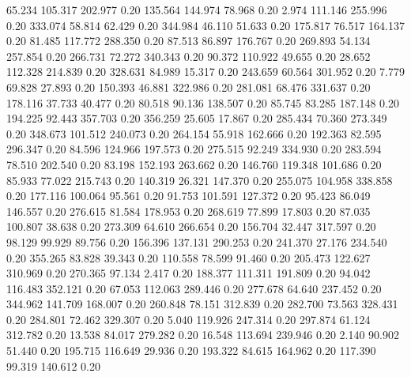   65.234  105.317  202.977         0.20
 135.564  144.974   78.968         0.20
   2.974  111.146  255.996         0.20
 333.074   58.814   62.429         0.20
 344.984   46.110   51.633         0.20
 175.817   76.517  164.137         0.20
  81.485  117.772  288.350         0.20
  87.513   86.897  176.767         0.20
 269.893   54.134  257.854         0.20
 266.731   72.272  340.343         0.20
  90.372  110.922   49.655         0.20
  28.652  112.328  214.839         0.20
 328.631   84.989   15.317         0.20
 243.659   60.564  301.952         0.20
   7.779   69.828   27.893         0.20
 150.393   46.881  322.986         0.20
 281.081   68.476  331.637         0.20
 178.116   37.733   40.477         0.20
  80.518   90.136  138.507         0.20
  85.745   83.285  187.148         0.20
 194.225   92.443  357.703         0.20
 356.259   25.605   17.867         0.20
 285.434   70.360  273.349         0.20
 348.673  101.512  240.073         0.20
 264.154   55.918  162.666         0.20
 192.363   82.595  296.347         0.20
  84.596  124.966  197.573         0.20
 275.515   92.249  334.930         0.20
 283.594   78.510  202.540         0.20
  83.198  152.193  263.662         0.20
 146.760  119.348  101.686         0.20
  85.933   77.022  215.743         0.20
 140.319   26.321  147.370         0.20
 255.075  104.958  338.858         0.20
 177.116  100.064   95.561         0.20
  91.753  101.591  127.372         0.20
  95.423   86.049  146.557         0.20
 276.615   81.584  178.953         0.20
 268.619   77.899   17.803         0.20
  87.035  100.807   38.638         0.20
 273.309   64.610  266.654         0.20
 156.704   32.447  317.597         0.20
  98.129   99.929   89.756         0.20
 156.396  137.131  290.253         0.20
 241.370   27.176  234.540         0.20
 355.265   83.828   39.343         0.20
 110.558   78.599   91.460         0.20
 205.473  122.627  310.969         0.20
 270.365   97.134    2.417         0.20
 188.377  111.311  191.809         0.20
  94.042  116.483  352.121         0.20
  67.053  112.063  289.446         0.20
 277.678   64.640  237.452         0.20
 344.962  141.709  168.007         0.20
 260.848   78.151  312.839         0.20
 282.700   73.563  328.431         0.20
 284.801   72.462  329.307         0.20
   5.040  119.926  247.314         0.20
 297.874   61.124  312.782         0.20
  13.538   84.017  279.282         0.20
  16.548  113.694  239.946         0.20
   2.140   90.902   51.440         0.20
 195.715  116.649   29.936         0.20
 193.322   84.615  164.962         0.20
 117.390   99.319  140.612         0.20
